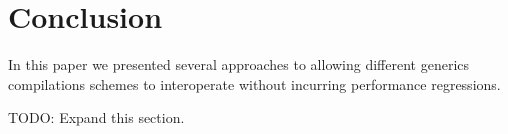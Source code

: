 \vspace{-0.5em}

\section{Conclusion}

In this paper we presented several approaches to allowing different generics compilations schemes to interoperate without incurring performance regressions.

TODO: Expand this section.